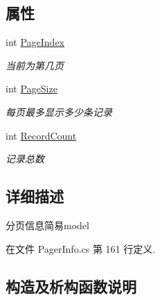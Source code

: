 \subsection*{属性}
\begin{DoxyCompactItemize}
\item 
int \hyperlink{class_x_c_l_net_tools_1_1_entity_1_1_pager_info_simple_a92e66733aad9fb09cec9df1fdb39beb2}{Page\+Index}
\begin{DoxyCompactList}\small\item\em 当前为第几页 \end{DoxyCompactList}\item 
int \hyperlink{class_x_c_l_net_tools_1_1_entity_1_1_pager_info_simple_a3a8883f09f14d322edc5e8be13f75cb6}{Page\+Size}
\begin{DoxyCompactList}\small\item\em 每页最多显示多少条记录 \end{DoxyCompactList}\item 
int \hyperlink{class_x_c_l_net_tools_1_1_entity_1_1_pager_info_simple_abe1bab597cad994b4515208cbb77f0bf}{Record\+Count}
\begin{DoxyCompactList}\small\item\em 记录总数 \end{DoxyCompactList}\end{DoxyCompactItemize}


\subsection{详细描述}
分页信息简易model 



在文件 Pager\+Info.\+cs 第 161 行定义.



\subsection{构造及析构函数说明}
\mbox{\label{class_x_c_l_net_tools_1_1_entity_1_1_pager_info_simple_ad1b150dae6e6ca09d37f0335b9833896}} 
